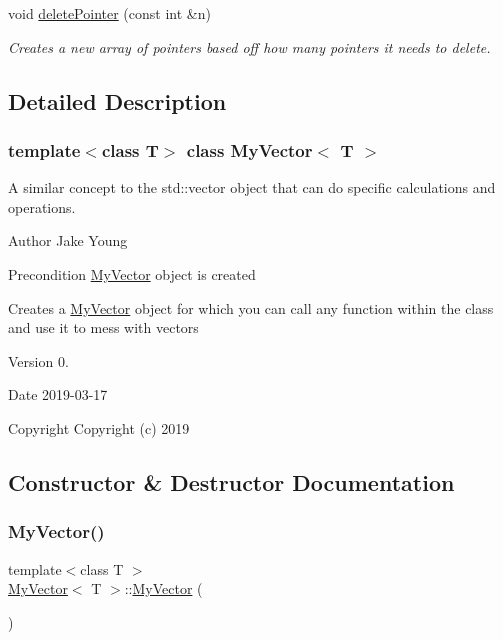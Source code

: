 \begin{DoxyCompactItemize}
void \mbox{\hyperlink{class_my_vector_a6a8887b23b9458bf8ec4cc95749d3eec}{delete\+Pointer}} (const int \&n)
\begin{DoxyCompactList}\small\item\em Creates a new array of pointers based off how many pointers it needs to delete. \end{DoxyCompactList}\end{DoxyCompactItemize}


\subsection{Detailed Description}
\subsubsection*{template$<$class T$>$\newline
class My\+Vector$<$ T $>$}

A similar concept to the std\+::vector object that can do specific calculations and operations. 

\begin{DoxyAuthor}{Author}
Jake Young 
\end{DoxyAuthor}
\begin{DoxyPrecond}{Precondition}
\mbox{\hyperlink{class_my_vector}{My\+Vector}} object is created 

Creates a \mbox{\hyperlink{class_my_vector}{My\+Vector}} object for which you can call any function within the class and use it to mess with vectors 
\end{DoxyPrecond}
\begin{DoxyVersion}{Version}
0. 
\end{DoxyVersion}
\begin{DoxyDate}{Date}
2019-\/03-\/17
\end{DoxyDate}
\begin{DoxyCopyright}{Copyright}
Copyright (c) 2019 
\end{DoxyCopyright}


\subsection{Constructor \& Destructor Documentation}
\mbox{\label{class_my_vector_ac356762c5ced52c0d934476cef32e472}} 
\subsubsection{\texorpdfstring{MyVector()}{MyVector()}\hspace{0.1cm}{\footnotesize\ttfamily [1/4]}}
{\footnotesize\ttfamily template$<$class T $>$ \\
\mbox{\hyperlink{class_my_vector}{My\+Vector}}$<$ T $>$\+::\mbox{\hyperlink{class_my_vector}{My\+Vector}} (\begin{DoxyParamCaption}{ }\end{DoxyParamCaption})}



